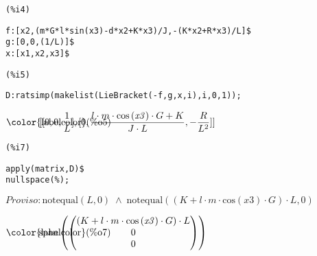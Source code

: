 \noindent
\begin{minipage}[t]{8ex}\color{red}\bf
\begin{verbatim}
(%i4) 
\end{verbatim}
\end{minipage}
\begin{minipage}[t]{\textwidth}\color{blue}
\begin{verbatim}
f:[x2,(m*G*l*sin(x3)-d*x2+K*x3)/J,-(K*x2+R*x3)/L]$
g:[0,0,(1/L)]$
x:[x1,x2,x3]$
\end{verbatim}
\end{minipage}


\noindent
\begin{minipage}[t]{8ex}\color{red}\bf
\begin{verbatim}
(%i5) 
\end{verbatim}
\end{minipage}
\begin{minipage}[t]{\textwidth}\color{blue}
\begin{verbatim}
D:ratsimp(makelist(LieBracket(-f,g,x,i),i,0,1));
\end{verbatim}
\end{minipage}

\begin{math}\displaystyle
\parbox{8ex}{\color{labelcolor}(\%o5) }
[[0,0,\frac{1}{L}],[0,\frac{l\cdot m\cdot \mathrm{cos}\left( \mathit{x3}\right) \cdot G+K}{J\cdot L},-\frac{R}{{{L}^{2}}}]]\mbox{}
\end{math}


\noindent
\begin{minipage}[t]{8ex}\color{red}\bf
\begin{verbatim}
(%i7) 
\end{verbatim}
\end{minipage}
\begin{minipage}[t]{\textwidth}\color{blue}
\begin{verbatim}
apply(matrix,D)$
nullspace(%);
\end{verbatim}
\end{minipage}
\begin{math}\displaystyle
Proviso: \mathrm{notequal}\left( L,0\right) \;\wedge\; \mathrm{notequal}\left( \left( K+l\cdot m\cdot \mathrm{cos}\left( \mathit{x3}\right) \cdot G\right) \cdot L,0\right)
\end{math}

\begin{math}\displaystyle
\parbox{8ex}{\color{labelcolor}(\%o7) }
\mathrm{span}\left( \begin{pmatrix}\left( K+l\cdot m\cdot \mathrm{cos}\left( \mathit{x3}\right) \cdot G\right) \cdot L\cr 0\cr 0\end{pmatrix}\right)
\end{math}
